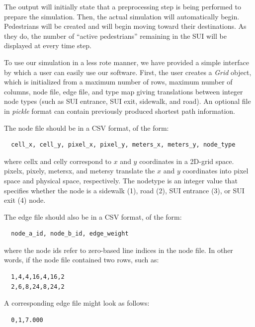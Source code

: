 \documentclass[12pt]{article}
\begin{document}
The output will initially state that a preprocessing step is being performed
to prepare the simulation. Then, the actual simulation will automatically begin.
Pedestrians will be created and will begin moving toward their destinations. As
they do, the number of ``active pedestrians'' remaining in the SUI will be
displayed at every time step.

To use our simulation in a less rote manner, we have provided a simple interface
by which a user can easily use our software. First, the user creates a
\textit{Grid} object, which is initialized from a maximum number of rows,
maximum number of columns, node file, edge file, and type map giving
translations between integer node types (such as SUI entrance, SUI exit,
sidewalk, and road). An optional file in \textit{pickle} format can contain
previously produced shortest path information.

The node file should be in a CSV format, of the form:

\begin{lstlisting}
  cell_x, cell_y, pixel_x, pixel_y, meters_x, meters_y, node_type
\end{lstlisting}

where cell\textunderscore x and cell\textunderscore y correspond to $x$ and $y$
coordinates in a 2D-grid space. pixel\textunderscore x, pixel\textunderscore y,
meters\textunderscore x, and meters\textunderscore y translate the $x$ and $y$
coordinates into pixel space and physical space, respectively. The
node\textunderscore type is an integer value that specifies whether the node
is a sidewalk (1), road (2), SUI entrance (3), or SUI exit (4) node.

The edge file should also be in a CSV format, of the form:

\begin{lstlisting}
  node_a_id, node_b_id, edge_weight
\end{lstlisting}

where the node ids refer to zero-based line indices in the node file. In other
words, if the node file contained two rows, such as:

\begin{lstlisting}
  1,4,4,16,4,16,2
  2,6,8,24,8,24,2
\end{lstlisting}

A corresponding edge file might look as follows:

\begin{lstlisting}
  0,1,7.000
\end{lstlisting}
\end{document}
